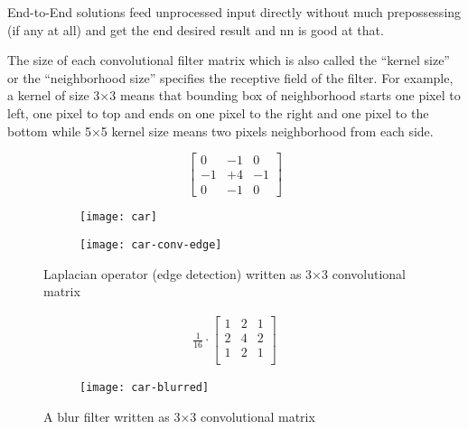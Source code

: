 End-to-End solutions feed unprocessed input directly without much prepossessing (if any at all)
and get the end desired result and \gls{nn} is good at that.

The size of each convolutional filter matrix which is also called the ``kernel size'' or the ``neighborhood size''
specifies the receptive field of the filter.
For example, a kernel of size 3×3 means that bounding box of neighborhood starts one pixel to left, one pixel to top
and ends on one pixel to the right and one pixel to the bottom while 5×5 kernel size means two pixels neighborhood
from each side. 

\begin{figure}[!htbp]
\centering
    \begin{subfigure}[b]{0.32\textwidth}
        \centering
\[
\begin{bmatrix}
0 & -1 & 0 \\
-1 & +4 & -1 \\
0 & -1 & 0 
\end{bmatrix}
\]
    \end{subfigure}
    \begin{subfigure}[b]{0.32\textwidth}
        \centering
        \texttt{[image: car]}
    \end{subfigure}
    \begin{subfigure}[b]{0.32\textwidth}
        \centering
        \texttt{[image: car-conv-edge]}
    \end{subfigure}
\caption{Laplacian operator (edge detection) written as 3×3 convolutional matrix}\label{fig:conv-edge}
\end{figure}

\begin{figure}[!ht]
\centering
    \begin{subfigure}[b]{0.32\textwidth}
        \centering
\[ \begin{aligned}
\frac{1}{16}\cdot
\begin{bmatrix}
1 & 2 & 1 \\
2 & 4 & 2 \\
1 & 2 & 1 \\
\end{bmatrix}
\end{aligned} \]
    \end{subfigure}
    \begin{subfigure}[b]{0.64\textwidth}
        \centering
        \texttt{[image: car-blurred]}
    \end{subfigure}
\caption{A blur filter written as 3×3 convolutional matrix}\label{fig:conv-blur}
\end{figure}

